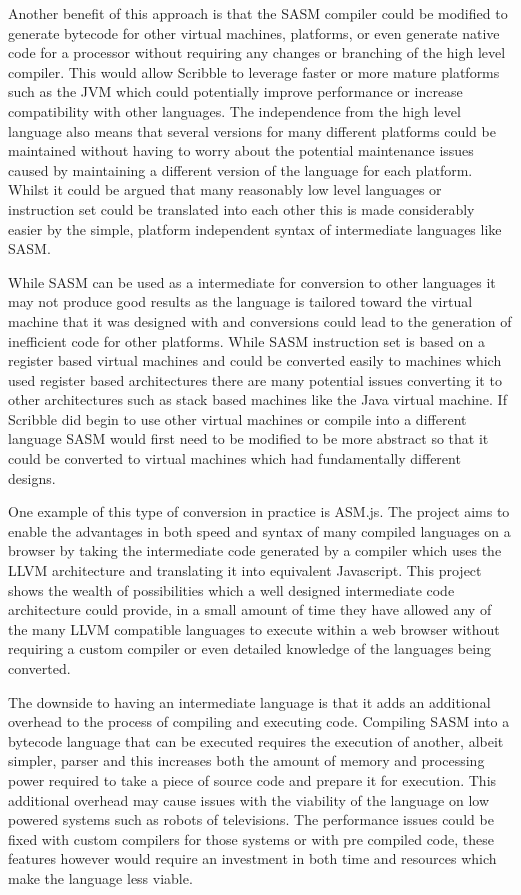 \documentclass[]{final_report}
\begin{document}
Another benefit of this approach is that the SASM compiler could be modified to generate bytecode for other virtual machines, platforms, or even generate native code for a processor without requiring any changes or branching of the high level compiler. This would allow Scribble to leverage faster or more mature platforms such as the JVM which could potentially improve performance or increase compatibility with other languages. The independence from the high level language also means that several versions for many different platforms could be maintained without having to worry about the potential maintenance issues caused by maintaining a different version of the language for each platform. Whilst it could be argued that many reasonably low level languages or instruction set could be translated into each other this is made considerably easier by the simple, platform independent syntax of intermediate languages like SASM.

While SASM can be used as a intermediate for conversion to other languages it may not produce good results as the language is tailored toward the virtual machine that it was designed with and conversions could lead to the generation of inefficient code for other platforms. While SASM instruction set is based on a register based virtual machines and could be converted easily to machines which used register based architectures there are many potential issues converting it to other architectures such as stack based machines like the Java virtual machine. If Scribble did begin to use other virtual machines or compile into a different language SASM would first need to be modified to be more abstract so that it could be converted to virtual machines which had fundamentally different designs.

One example of this type of conversion in practice is ASM.js. The project aims to enable the advantages in both speed and syntax of many compiled languages on a browser by taking the intermediate code generated by a compiler which uses the LLVM architecture and translating it into equivalent Javascript. This project shows the wealth of possibilities which a well designed intermediate code architecture could provide, in a small amount of time they have allowed any of the many LLVM compatible languages to execute within a web browser without requiring a custom compiler or even detailed knowledge of the languages being converted.

The downside to having an intermediate language is that it adds an additional overhead to the process of compiling and executing code. Compiling SASM into a bytecode language that can be executed requires the execution of another, albeit simpler, parser and this increases both the amount of memory and processing power required to take a piece of source code and prepare it for execution. This additional overhead may cause issues with the viability of the language on low powered systems such as robots of televisions. The performance issues could be fixed with custom compilers for those systems or with pre compiled code, these features however would require an investment in both time and resources which make the language less viable.
\end{document}
